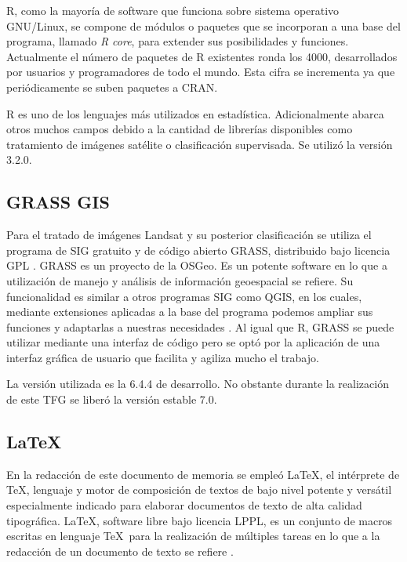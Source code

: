 R, como la mayoría de software que funciona sobre sistema operativo GNU/Linux, se compone de módulos o paquetes que se incorporan a una base del programa, llamado \textit{R core}, para extender sus posibilidades y funciones. Actualmente el número de paquetes de R existentes ronda los 4000, desarrollados por usuarios y programadores de todo el mundo. Esta cifra se incrementa ya que periódicamente se suben paquetes a \ac{CRAN}.\Sep

R es uno de los lenguajes más utilizados en estadística. Adicionalmente abarca otros muchos campos debido a la cantidad de librerías disponibles como tratamiento de imágenes satélite o clasificación supervisada. Se utilizó la versión 3.2.0.

\subsection{GRASS GIS}
Para el tratado de imágenes Landsat y su posterior clasificación se utiliza el programa de \ac{SIG} gratuito y de código abierto \ac{GRASS}, distribuido bajo licencia GPL \citep{GRASS_GIS_software}. GRASS es un proyecto de la \ac{OSGeo}. Es un potente software en lo que a utilización de manejo y análisis de información geoespacial se refiere. Su funcionalidad es similar a otros programas \ac{SIG} como QGIS, en los cuales, mediante extensiones aplicadas a la base del programa podemos ampliar sus funciones y adaptarlas a nuestras necesidades \citep{neteler2002open}. Al igual que R, \ac{GRASS} se puede utilizar mediante una interfaz de código pero se optó por la aplicación de una interfaz gráfica de usuario que facilita y agiliza mucho el trabajo.\Sep

La versión utilizada es la 6.4.4 de desarrollo. No obstante durante la realización de este \ac{TFG} se liberó la versión estable 7.0.

\subsection{\LaTeX}
En la redacción de este documento de memoria se empleó \LaTeX, el intérprete de \TeX, lenguaje y motor de composición de textos de bajo nivel potente y versátil especialmente indicado para elaborar documentos de texto de alta calidad tipográfica. \LaTeX, software libre bajo licencia LPPL, es un conjunto de macros escritas en lenguaje \TeX\ para la realización de múltiples tareas en lo que a la redacción de un documento de texto se refiere \citep{Latex2011} \citep{galindo2001} \citep{lamport1994}.\Sep

